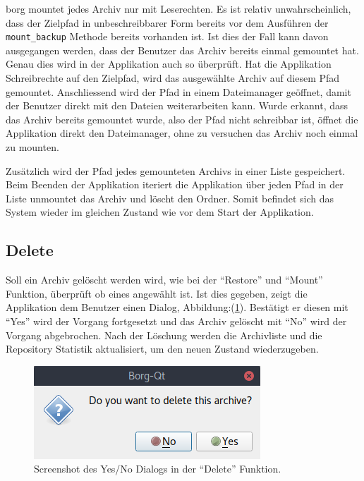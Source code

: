 \gls{borg} mountet jedes Archiv nur mit Leserechten. Es ist relativ
unwahrscheinlich, dass der Zielpfad in unbeschreibbarer Form bereits vor dem
Ausführen der \texttt{mount\_backup} Methode bereits vorhanden ist. Ist dies der Fall
kann davon ausgegangen werden, dass der Benutzer das Archiv bereits einmal
gemountet hat. Genau dies wird in der Applikation auch so überprüft. Hat die
Applikation Schreibrechte auf den Zielpfad, wird das ausgewählte Archiv auf
diesem Pfad gemountet. Anschliessend wird der Pfad in einem Dateimanager
geöffnet, damit der Benutzer direkt mit den Dateien weiterarbeiten kann. Wurde
erkannt, dass das Archiv bereits gemountet wurde, also der Pfad nicht
schreibbar ist, öffnet die Applikation direkt den Dateimanager, ohne zu
versuchen das Archiv noch einmal zu mounten.

Zusätzlich wird der Pfad jedes gemounteten Archivs in einer Liste gespeichert.
Beim Beenden der Applikation iteriert die Applikation über jeden Pfad in der
Liste unmountet das Archiv und löscht den Ordner. Somit befindet sich das
System wieder im gleichen Zustand wie vor dem Start der Applikation.

\subsection{Delete}
\label{sec:org387e3f8}

Soll ein Archiv gelöscht werden wird, wie bei der "`Restore"' und "`Mount"'
Funktion, überprüft ob eines angewählt ist. Ist dies gegeben, zeigt die
Applikation dem Benutzer einen Dialog, Abbildung:(\ref{fig:orgf3d4105}). Bestätigt er
diesen mit "`Yes"' wird der Vorgang fortgesetzt und das Archiv gelöscht mit "`No"'
wird der Vorgang abgebrochen. Nach der Löschung werden die Archivliste und die
Repository Statistik aktualisiert, um den neuen Zustand wiederzugeben.

\begin{figure}[H]
\centering
\includegraphics[width=.3\paperwidth]{pictures/borgqt_yes_no.png}
\caption{\label{fig:orgf3d4105}
Screenshot des Yes/No Dialogs in der "`Delete"' Funktion.}
\end{figure}

